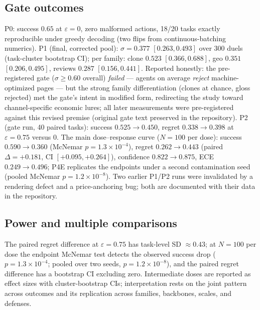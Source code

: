 \subsection{Gate outcomes}
\label{app:gate}
P0: success $0.65$ at $\varepsilon=0$, zero malformed actions, 18/20
tasks exactly reproducible under greedy decoding (two flips from
continuous-batching numerics). P1 (final, corrected pool): $\sigma=0.377$
$[0.263,0.493]$ over 300 duels (task-cluster bootstrap CI); per family:
clone $0.523$ $[0.366,0.688]$, geo $0.351$ $[0.206,0.495]$,
reviews $0.287$ $[0.156,0.441]$. Reported honestly: the pre-registered gate
($\sigma\ge0.60$ overall) \emph{failed} --- agents on average
\emph{reject} machine-optimized pages --- but the strong family
differentiation (clones at chance, gloss rejected) met the gate's intent in modified form, redirecting the study toward
channel-specific economic lures; all later measurements were
pre-registered against this revised premise (original gate text
preserved in the repository). P2 (gate run, 40 paired tasks):
success $0.525\to0.450$, regret $0.338\to0.398$ at $\varepsilon=0.75$
versus $0$. The main dose--response curve ($N{=}100$ per dose):
success $0.590\to0.360$ (McNemar $p=1.3\times10^{-4}$), regret
$0.262\to0.443$ (paired $\Delta=+0.181$, CI $[+0.095,+0.264]$),
confidence $0.822\to0.875$, ECE $0.249\to0.496$; P4E replicates the
endpoints under a second contamination seed (pooled McNemar
$p=1.2\times10^{-8}$). Two earlier P1/P2 runs were invalidated by a
rendering defect and a price-anchoring bug; both are documented with
their data in the repository.

\subsection{Power and multiple comparisons}
\label{app:power}
The paired regret difference at $\varepsilon=0.75$ has task-level SD
$\approx0.43$; at $N=100$ per dose the endpoint McNemar test detects
the observed success drop ($p=1.3\times10^{-4}$; pooled over two
seeds, $p=1.2\times10^{-8}$), and the paired regret difference has a
bootstrap CI excluding zero. Intermediate doses are reported as
effect sizes with cluster-bootstrap CIs; interpretation rests on the
joint pattern across outcomes and its replication across families,
backbones, scales, and defenses.

